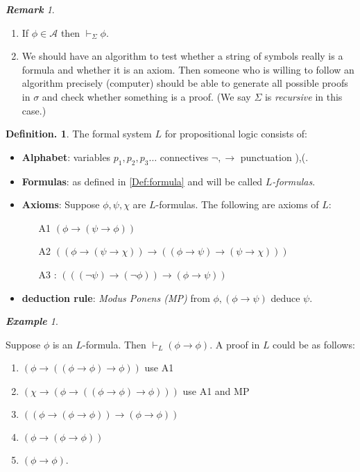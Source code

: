 \documentclass[a4paper,oneside,11pt,DIV=12,parskip=half]{scrartcl}
\theoremstyle{plain}
\theoremstyle{definition}
\newtheorem{definition}[theorem]{Definition.}
\newtheorem{remark, definition}[theorem]{Remark and Definition.}
\newtheorem{lemma, definition}[theorem]{Lemma and Definition.}
\newtheorem{theorem, definition}[theorem]{Theorem and Definition.}
\theoremstyle{remark}
\newtheorem*{remark}{\textbf{Remark}}
\newtheorem*{example}{\textbf{Example}}
\newtheorem*{remark, example}{\textbf{Remark and Exercise}}
\begin{document}
\begin{remark}
\begin{enumerate}
    \item If $\phi \in \mathcal{A}$ then $\vdash_\Sigma \phi$.
    \item We should have an algorithm to test whether a string of symbols really is a formula and whether it is an axiom. Then someone who is willing to follow an algorithm precisely (computer) should be able to generate all possible proofs in $\sigma$ and check whether something is a proof. (We say $\Sigma$ is \emph{recursive} in this case.)
\end{enumerate}
\end{remark}

\begin{definition}
The formal system $L$ for propositional logic consists of:

\begin{itemize}
    \item \textbf{Alphabet}: variables $p_1,p_2,p_3\dots$  connectives $\lnot,\rightarrow$
    punctuation ),(.
    \item \textbf{Formulas}: as defined in \ref{Def:formula} and will be called \emph{$L$-formulas}.
    \item \textbf{Axioms}: Suppose $\phi,\psi,\chi$ are $L$-formulas. The following are axioms of $L$:
    \begin{itemize}
        \item[A1] $(\phi \rightarrow (\psi \rightarrow \phi))$
        \item[A2] $((\phi \rightarrow (\psi \rightarrow \chi)) \rightarrow ((\phi \rightarrow \psi) \rightarrow (\psi \rightarrow \chi)))$
        \item[A3]: $(((\lnot \psi) \rightarrow ( \lnot \phi)) \rightarrow (\phi \rightarrow \psi))$
    \end{itemize}
    \item \textbf{deduction rule}: \emph{ Modus Ponens (MP)} from $\phi,  (\phi \rightarrow \psi)$ deduce $\psi$.
\end{itemize}

\begin{example} \label{rem:phi_implies_phi}

Suppose $\phi$ is an $L$-formula. Then $\vdash_L (\phi \rightarrow \phi)$.
A proof in $L$ could be as follows:
\begin{enumerate}
    \item $(\phi \rightarrow ((\phi \rightarrow \phi) \rightarrow \phi))$ use A1
    \item $(\chi \rightarrow (\phi \rightarrow ((\phi \rightarrow \phi) \rightarrow \phi)))$ use A1 and MP
    \item $((\phi \rightarrow (\phi \rightarrow \phi)) \rightarrow (\phi \rightarrow \phi))$
    \item $(\phi \rightarrow (\phi \rightarrow \phi))$
    \item $(\phi \rightarrow \phi)$.
\end{enumerate}
\end{example}
\end{definition}
\end{document}
